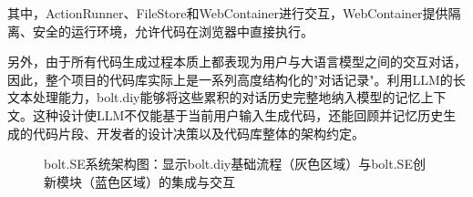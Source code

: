 其中，ActionRunner、FileStore和WebContainer进行交互，WebContainer提供隔离、安全的运行环境，允许代码在浏览器中直接执行。

另外，由于所有代码生成过程本质上都表现为用户与大语言模型之间的交互对话，因此，整个项目的代码库实际上是一系列高度结构化的"对话记录"。利用LLM的长文本处理能力，bolt.diy能够将这些累积的对话历史完整地纳入模型的记忆上下文。这种设计使LLM不仅能基于当前用户输入生成代码，还能回顾并记忆历史生成的代码片段、开发者的设计决策以及代码库整体的架构约定。

\begin{figure}[htbp]
  \caption{bolt.SE系统架构图：显示bolt.diy基础流程（灰色区域）与bolt.SE创新模块（蓝色区域）的集成与交互}
  \label{fig:bolt_sequence}
\end{figure}
    
    
